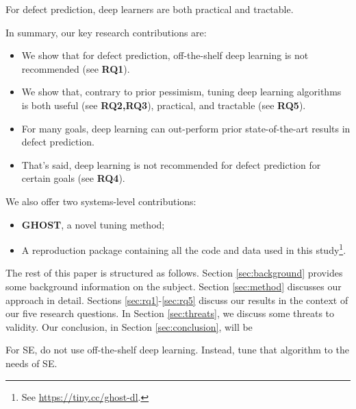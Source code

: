 \documentclass[10pt,compsoc,twocolumn]{IEEEtran}
\begin{document}
\begin{blockquote}
    \noindent
  For defect prediction,  deep learners are both practical and tractable.
\end{blockquote}
\noindent
In summary, our key research contributions are:
\begin{itemize}
\item We show that for defect prediction, off-the-shelf deep learning is not recommended (see {\bf RQ1}).
    \item We show that, contrary to prior pessimism, tuning deep learning  algorithms is both useful (see {\bf RQ2,RQ3}), practical, and tractable (see {\bf RQ5}). 
       \item For many goals,   deep learning can out-perform prior state-of-the-art results in defect prediction. 
\item %
That's said, 
deep learning is not recommended for defect prediction for certain goals (see {\bf RQ4}).
\end{itemize}
  We also offer two systems-level contributions:
    \begin{itemize}
    \item  
    \textbf{GHOST}, a novel
    tuning method;
    \item A reproduction package containing all the code and data used in this study\footnote{See
    \url{https://tiny.cc/ghost-dl}. }.
    \end{itemize}
The rest of this paper is structured as follows. Section \ref{sec:background} provides some background information on the subject. Section \ref{sec:method} discusses our approach in detail. Sections \ref{sec:rq1}-\ref{sec:rq5} discuss our results in the context of our five research questions. In Section \ref{sec:threats}, we discuss some threats to validity. Our  conclusion,  in Section \ref{sec:conclusion}, will be
\begin{blockquote}
    \noindent
    For SE,  do not use   off-the-shelf  deep learning. 
  Instead,
tune that algorithm to the needs of SE.
\end{blockquote}
 
\end{document}
